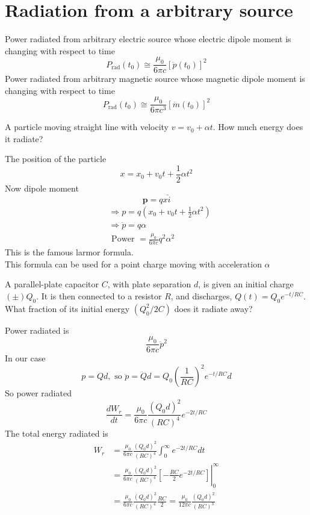 \section{Radiation from a arbitrary source}
Power radiated from arbitrary electric source whose electric dipole moment is changing with respect to time\\
$$P_{\operatorname{rad}}\left(t_{0}\right) \cong \frac{\mu_{0}}{6 \pi c}\left[\ddot{p}\left(t_{0}\right)\right]^{2}$$
Power radiated from arbitrary magnetic source whose magnetic dipole moment is changing with respect to time
$$P_{\mathrm{rad}}\left(t_{0}\right) \cong \frac{\mu_{0}}{6 \pi c^{3}}\left[\ddot{m}\left(t_{0}\right)\right]^{2}$$
\begin{exercise}
 A particle moving straight line with velocity $v=v_{0}+\alpha t$. How much energy does it radiate?
\end{exercise}
\begin{answer}
The position of the particle
$$
x=x_{0}+v_{0} t+\frac{1}{2} \alpha t^{2}
$$
Now dipole moment
$$
\mathbf{p}=q x \hat{i}
$$
$$\begin{aligned}
	&\Rightarrow p=q\left(x_{0}+v_{0} t+\frac{1}{2} \alpha t^{2}\right) \\
	&\Rightarrow \ddot{p}=q \alpha \\
	&\text { Power }=\frac{\mu_{0}}{6 \pi c} q^{2} \alpha^{2}
\end{aligned}$$
This is the famous larmor formula.\\
This formula can be used for a point charge moving with acceleration $\alpha$	
\end{answer}
\begin{exercise}
	 A parallel-plate capacitor $C$, with plate separation $d$, is given an initial charge $(\pm) Q_{0}$. It is then connected to a resistor $R$, and discharges, $Q(t)=Q_{0} e^{-t / R C}$. What fraction of its initial energy $\left(Q_{0}^{2} / 2 C\right)$ does it radiate away?
\end{exercise}
\begin{answer}
	Power radiated is
	$$
	\frac{\mu_{0}}{6 \pi c} \ddot{p}^{2}
	$$
	In our case
	$$
	p=Q d, \text { so } \ddot{p}=\ddot{Q} d=Q_{0}\left(\frac{1}{R C}\right)^{2} e^{-t / R C} d
	$$
	So power radiated
	$$
	\frac{d W_{r}}{d t}=\frac{\mu_{0}}{6 \pi c} \frac{\left(Q_{0} d\right)^{2}}{(R C)^{4}} e^{-2 t / R C}
	$$
	The total energy radiated is
	$$
	\begin{aligned}
	W_{r} &=\frac{\mu_{0}}{6 \pi c} \frac{\left(Q_{0} d\right)^{2}}{(R C)^{4}} \int_{0}^{\infty} e^{-2 t / R C} d t \\
	&=\left.\frac{\mu_{0}}{6 \pi c} \frac{\left(Q_{0} d\right)^{2}}{(R C)^{4}}\left[-\frac{R C}{2} e^{-2 t / R C}\right]\right|_{0} ^{\infty} \\
	&=\frac{\mu_{0}}{6 \pi c} \frac{\left(Q_{0} d\right)^{2}}{(R C)^{4}} \frac{R C}{2}=\frac{\mu_{0}}{12 \pi c} \frac{\left(Q_{0} d\right)^{2}}{(R C)^{3}}
	\end{aligned}
	$$
\end{answer}
